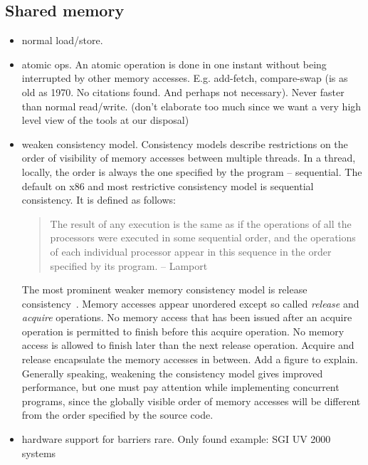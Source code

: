 \documentclass[a4paper, 10pt]{article}
\begin{document}
\subsection{Shared memory}
\begin{itemize}
	\item normal load/store.
	\item atomic ops. An atomic operation is done in one instant without being interrupted by other memory accesses. E.g. add-fetch, compare-swap (is as old as 1970. No citations found. And perhaps not necessary). Never faster than normal read/write. (don't elaborate too much since we want a very high level view of the tools at our disposal)
	\item weaken consistency model. Consistency models describe restrictions on the order of visibility of memory accesses between multiple threads. In a thread, locally, the order is always the one specified by the program -- sequential. The default on x86 and most restrictive consistency model is sequential consistency. It is defined as follows:
		\begin{quote}
			The result of any execution is the same as if the operations of all the processors were executed in some sequential order, and the operations of each individual processor appear in this sequence in the order specified by its program. -- Lamport~\cite{sequentialconsistency}
		\end{quote}
		The most prominent weaker memory consistency model is release consistency~\cite{gha90}. Memory accesses appear unordered except so called \emph{release} and \emph{acquire} operations. No memory access that has been issued after an acquire operation is permitted to finish before this acquire operation. No memory access is allowed to finish later than the next release operation. Acquire and release encapsulate the memory accesses in between. Add a figure to explain. Generally speaking, weakening the consistency model gives improved performance, but one must pay attention while implementing concurrent programs, since the globally visible order of memory accesses will be different from the order specified by the source code.
	\item hardware support for barriers rare. Only found example: SGI UV 2000 systems\cite{sgiuv2000}
\end{itemize}

\end{document}
